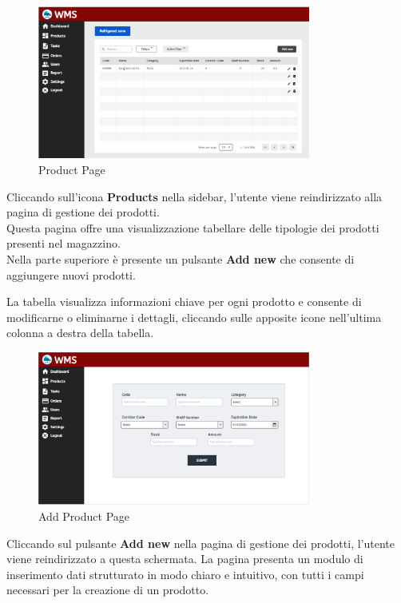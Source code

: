 \begin{figure}[H]
    \centering
    \includegraphics[width=0.8\textwidth]{document/sections/img/productPage.png}
    \caption{Product Page}
    \label{fig:productPage}
\end{figure}

Cliccando sull'icona \textbf{Products} nella sidebar, l'utente viene reindirizzato alla pagina di gestione dei prodotti.\\
Questa pagina offre una visualizzazione tabellare delle tipologie dei prodotti presenti nel magazzino.\\
Nella parte superiore è presente un pulsante \textbf{Add new} che consente di aggiungere nuovi prodotti.

La tabella visualizza informazioni chiave per ogni prodotto e consente di modificarne o eliminarne i dettagli,
cliccando sulle apposite icone nell'ultima colonna a destra della tabella.\\

\begin{figure}[H]
    \centering
    \includegraphics[width=0.8\textwidth]{document/sections/img/AddProduct.png}
    \caption{Add Product Page}
    \label{fig:addProductPage}
\end{figure}
Cliccando sul pulsante \textbf{Add new} nella pagina di gestione dei prodotti,
l'utente viene reindirizzato a questa schermata.
La pagina presenta un modulo di inserimento dati strutturato in modo chiaro e intuitivo,
con tutti i campi necessari per la creazione di un prodotto.


